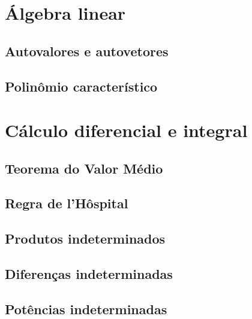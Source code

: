\documentclass[12pt, a4paper]{article}
\begin{document}
	

	\section{Álgebra linear}
		\subsection{Autovalores e autovetores}
		
		
		\subsection{Polinômio característico}
		
	
	\section{Cálculo diferencial e integral}
		\subsection{Teorema do Valor Médio}
			
	
		\subsection{Regra de l'Hôspital}
		

		\subsection{Produtos indeterminados}
		
		
		\subsection{Diferenças indeterminadas}
		
	
		\subsection{Potências indeterminadas}
		
		
	
\end{document}
